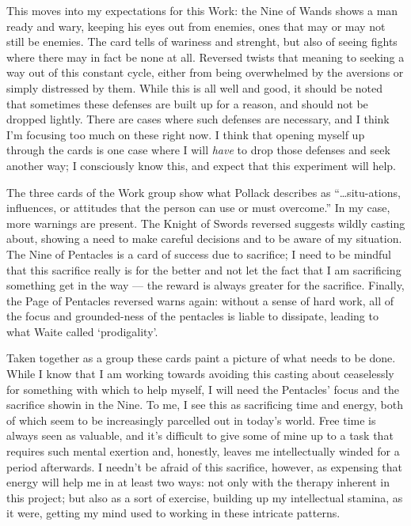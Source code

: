 This moves into my expectations for this Work: the Nine of Wands shows a
man ready and wary, keeping his eyes out from enemies, ones that may or
may not still be enemies.  The card tells of wariness and strenght, but
also of seeing fights where there may in fact be none at all.  Reversed
twists that meaning to seeking a way out of this constant cycle, either
from being overwhelmed by the aversions or simply distressed by them.
While this is all well and good, it should be noted that sometimes these
defenses are built up for a reason, and should not be dropped lightly.
There are cases where such defenses are necessary, and I think I'm
focusing too much on these right now.  I think that opening myself up
through the cards is one case where I will \emph{have} to drop those
defenses and seek another way; I consciously know this, and expect
that this experiment will help.

The three cards of the Work group show what Pollack describes as
``\ldots{}situ-ations, influences, or attitudes that the person can use
or must overcome.''  In my case, more warnings are present.  The Knight
of Swords reversed suggests wildly casting about, showing a need to make
careful decisions and to be aware of my situation.  The Nine of
Pentacles is a card of success due to sacrifice; I need to be mindful
that this sacrifice really is for the better and not let the fact that I
am sacrificing something get in the way --- the reward is always greater
for the sacrifice.  Finally, the Page of Pentacles reversed warns again:
without a sense of hard work, all of the focus and grounded-ness of the
pentacles is liable to dissipate, leading to what Waite called
`prodigality'.

Taken together as a group these cards paint a picture of what needs to
be done.  While I know that I am working towards avoiding this casting
about ceaselessly for something with which to help myself, I will need
the Pentacles' focus and the sacrifice showin in the Nine.  To me, I see
this as sacrificing time and energy, both of which seem to be
increasingly parcelled out in today's world.  Free time is always seen
as valuable, and it's difficult to give some of mine up to a task that
requires such mental exertion and, honestly, leaves me intellectually
winded for a period afterwards.  I needn't be afraid of this sacrifice,
however, as expensing that energy will help me in at least two ways: not 
only with the therapy inherent in this project; but also as a sort of
exercise, building up my intellectual stamina, as it were, getting my
mind used to working in these intricate patterns.

